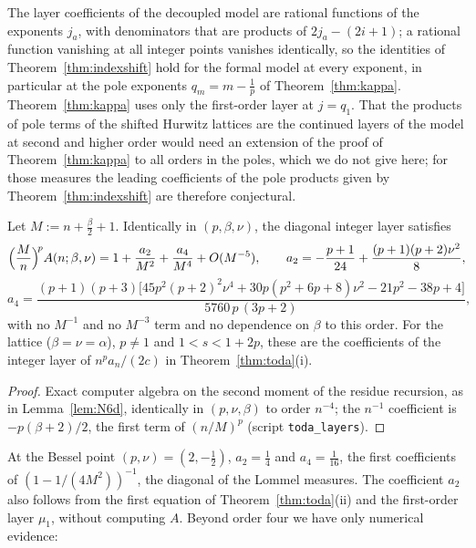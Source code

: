 \begin{remark}\label{rem:indexshift-poles}
The layer coefficients of the decoupled model are rational functions of the exponents $j_a$, with denominators that are products of
$2j_a-(2i+1)$; a rational function vanishing at all integer points vanishes identically, so the identities of
Theorem~\ref{thm:indexshift} hold for the formal model at every exponent, in particular at the pole exponents $q_m=m-\frac1p$ of
Theorem~\ref{thm:kappa}. Theorem~\ref{thm:kappa} uses only the first-order layer at $j=q_1$. That the products of pole terms of the
shifted Hurwitz lattices are the continued layers of the model at second and higher order would need an extension of the proof of
Theorem~\ref{thm:kappa} to all orders in the poles, which we do not give here; for those measures the leading coefficients of the pole
products given by Theorem~\ref{thm:indexshift} are therefore conjectural.
\end{remark}

\begin{proposition}\label{prop:diag4}
Let $M:=n+\frac\beta2+1$. Identically in $(p,\beta,\nu)$, the diagonal integer layer satisfies
\[
  \Bigl(\frac Mn\Bigr)^{\!p}A(n;\beta,\nu)=1+\frac{a_2}{M^2}+\frac{a_4}{M^4}+O(M^{-5}),\qquad a_2=-\frac{p+1}{24}+\frac{(p+1)(p+2)\nu^2}8,
\]
\[
  a_4=\frac{(p+1)(p+3)\bigl[45p^2(p+2)^2\nu^4+30p(p^2+6p+8)\nu^2-21p^2-38p+4\bigr]}{5760\,p\,(3p+2)},
\]
with no $M^{-1}$ and no $M^{-3}$ term and no dependence on $\beta$ to this order. For the lattice ($\beta=\nu=\alpha$), $p\ne1$ and
$1<s<1+2p$, these are the coefficients of the integer layer of $n^pa_n/(2c)$ in Theorem~\ref{thm:toda}(i).
\end{proposition}

\begin{proof}
Exact computer algebra on the second moment of the residue recursion, as in Lemma~\ref{lem:N6d}, identically in $(p,\nu,\beta)$ to order
$n^{-4}$; the $n^{-1}$ coefficient is $-p(\beta+2)/2$, the first term of $(n/M)^p$ (script \texttt{toda\_layers}).
\end{proof}

At the Bessel point $(p,\nu)=(2,-\frac12)$, $a_2=\frac14$ and $a_4=\frac1{16}$, the first coefficients of $(1-1/(4M^2))^{-1}$, the
diagonal of the Lommel measures. The coefficient $a_2$ also follows from the first equation of Theorem~\ref{thm:toda}(ii) and the
first-order layer $\mu_1$, without computing $A$. Beyond order four we have only numerical evidence:

